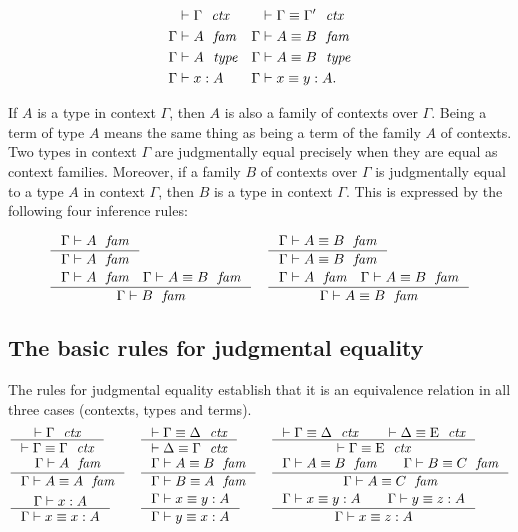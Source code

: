 \begin{align*}
\jctx*{\Gamma} & \jctxeq*{\Gamma}{\Gamma'}\\
\jfam*{\Gamma}{A} & \jfameq*{\Gamma}{A}{B}\\
\jtype*{\Gamma}{A} & \jtypeeq*{\Gamma}{A}{B}\\
\jterm*{\Gamma}{A}{x} & \jtermeq*{\Gamma}{A}{x}{y}.
\end{align*}

If $A$ is a type
in context $\Gamma$, then $A$ is also a family of contexts over $\Gamma$. Being
a term of type $A$ means the same thing as being a term of the family $A$ of contexts.
Two types in context $\Gamma$ are judgmentally equal precisely when they are equal
as context families. Moreover, if a family $B$ of contexts over $\Gamma$ is
judgmentally equal to a type $A$ in context $\Gamma$, then $B$ is a type in
context $\Gamma$. This is expressed by the following four inference rules:

\begin{align*}
& \inference{\jfam{\Gamma}{A}}{\jfam{\Gamma}{A}} & & \inference{\jfameq{\Gamma}{A}{B}}{\jfameq{\Gamma}{A}{B}}\\
& \inference{\jfam{\Gamma}{A}\quad\jfameq{\Gamma}{A}{B}}{\jfam{\Gamma}{B}}
& & \inference{\jfam{\Gamma}{A}\quad\jfameq{\Gamma}{A}{B}}{\jfameq{\Gamma}{A}{B}}
\end{align*}


\subsection{The basic rules for judgmental equality}
The rules for judgmental equality establish that it is an equivalence relation
in all three cases (contexts, types and terms).
\bgroup\small
\begin{align*}
& \inference{\jctx{\Gamma}}{\jctxeq{\Gamma}{\Gamma}} 
& & \inference{\jctxeq{\Gamma}{\Delta}}{\jctxeq{\Delta}{\Gamma}} 
& & \inference{\jctxeq{\Gamma}{\Delta}\qquad\jctxeq{\Delta}{\greek{E}}}{\jctxeq{\Gamma}{\greek{E}}}\\
& \inference{\jfam{\Gamma}{A}}{\jfameq{\Gamma}{A}{A}} 
& & \inference{\jfameq{\Gamma}{A}{B}}{\jfameq{\Gamma}{B}{A}}
& & \inference{\jfameq{\Gamma}{A}{B}\qquad\jfameq{\Gamma}{B}{C}}{\jfameq{\Gamma}{A}{C}}\\
& \inference{\jterm{\Gamma}{A}{x}}{\jtermeq{\Gamma}{A}{x}{x}}
& & \inference{\jtermeq{\Gamma}{A}{x}{y}}{\jtermeq{\Gamma}{A}{y}{x}}
& & \inference{\jtermeq{\Gamma}{A}{x}{y}\qquad\jtermeq{\Gamma}{A}{y}{z}}{\jtermeq{\Gamma}{A}{x}{z}}
\end{align*}
\egroup

